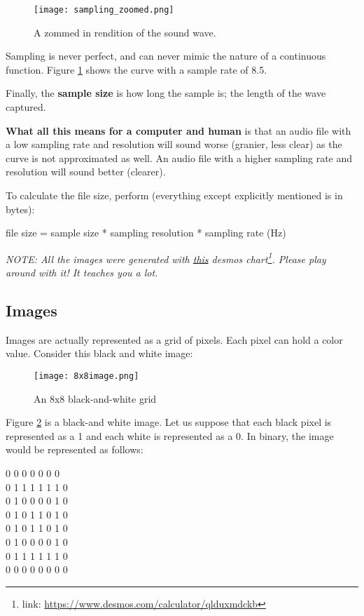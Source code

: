 \documentclass[../main.tex]{subfiles}
\begin{document}
\begin{figure}[H]
    \centering
    \texttt{[image: sampling\_zoomed.png]}
    \caption{A zommed in rendition of the sound wave.}
    \label{fig:sampling_zoomed}
\end{figure}

Sampling is never perfect, and can never mimic the nature of a continuous function. Figure \ref{fig:sampling_zoomed} shows the curve with a sample rate of 8.5.

Finally, the \textbf{sample size} is how long the sample is; the length of the wave captured.

\textbf{What all this means for a computer and human} is that an audio file with a low sampling rate and resolution will sound worse (granier, less clear) as the curve is not approximated as well. An audio file with a higher sampling rate and resolution will sound better (clearer).

To calculate the file size, perform (everything except explicitly mentioned is in bytes):

{\centering\ccmono
file size = sample size * sampling resolution * sampling rate (Hz)
}

\textit{NOTE: All the images were generated with \href{https://www.desmos.com/calculator/qlduxmdckb}{this} desmos chart\footnote{link: \url{https://www.desmos.com/calculator/qlduxmdckb}}. Please play around with it! It teaches you a lot.}

\newpage
\subsection{Images}

Images are actually represented as a grid of pixels. Each pixel can hold a color value. Consider this black and white image:

\begin{figure}[H]
    \centering
    \texttt{[image: 8x8image.png]}
    \caption{An 8x8 black-and-white grid}
    \label{fig:8x8image}
\end{figure}

Figure \ref{fig:8x8image} is a black-and white image. Let us suppose that each black pixel is represented as a 1 and each white is represented as a 0. In binary, the image would be represented as follows:

\medskip

{\ccmono{} 0 0 0 0 0 0 0\\
    0 1 1 1 1 1 1 0\\
    0 1 0 0 0 0 1 0\\
    0 1 0 1 1 0 1 0\\
    0 1 0 1 1 0 1 0\\
    0 1 0 0 0 0 1 0\\
    0 1 1 1 1 1 1 0\\
    0 0 0 0 0 0 0 0\\
}
\end{document}
